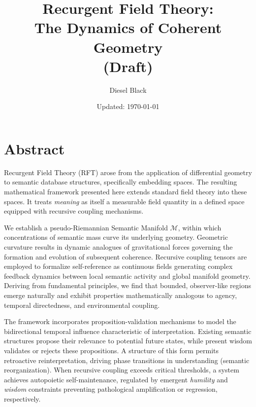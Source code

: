\documentclass[11pt, a4paper]{report}
\title{Recurgent Field Theory: \\ The Dynamics of Coherent Geometry \\ \vspace{1em} \small{(Draft)}}
\author{Diesel Black}
\date{Updated: \today}
\begin{document}

\maketitle

\section*{Abstract}

Recurgent Field Theory (RFT) arose from the application of differential geometry to semantic database structures, specifically embedding spaces. The resulting mathematical framework presented here extends standard field theory into these spaces. It treats \textit{meaning} as itself a measurable field quantity in a defined space equipped with recursive coupling mechanisms.

\vspace{1em}

We establish a pseudo-Riemannian Semantic Manifold \(\mathcal{M}\), within which concentrations of semantic mass curve its underlying geometry. Geometric curvature results in dynamic analogues of gravitational forces governing the formation and evolution of subsequent coherence. Recursive coupling tensors are employed to formalize self-reference as continuous fields generating complex feedback dynamics between local semantic activity and global manifold geometry. Deriving from fundamental principles, we find that bounded, observer-like regions emerge naturally and exhibit properties mathematically analogous to agency, temporal directedness, and environmental coupling.

\vspace{1em}

The framework incorporates proposition-validation mechanisms to model the bidirectional temporal influence characteristic of interpretation. Existing semantic structures propose their relevance to potential future states, while present wisdom validates or rejects these propositions. A structure of this form permits retroactive reinterpretation, driving phase transitions in understanding (semantic reorganization). When recursive coupling exceeds critical thresholds, a system achieves autopoietic self-maintenance, regulated by emergent \textit{humility} and \textit{wisdom} constraints preventing pathological amplification or regression, respectively.

\vspace{1em}
\end{document}
